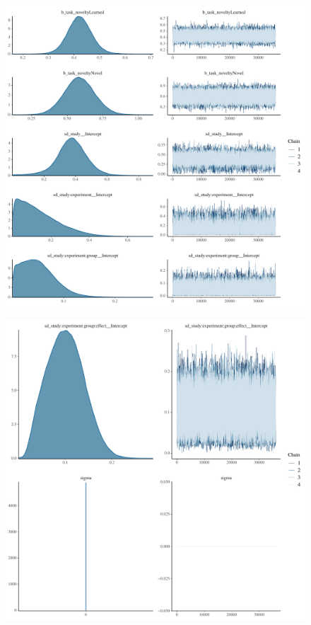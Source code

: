 \documentclass[
]{report}
\begin{document}
\begin{figure}

{\centering \includegraphics[width=1\textwidth,height=\textheight]{diagnostic_plots_files/figure-pdf/unnamed-chunk-17-1.pdf}

}

\end{figure}

\begin{figure}

{\centering \includegraphics[width=1\textwidth,height=\textheight]{diagnostic_plots_files/figure-pdf/unnamed-chunk-17-2.pdf}

}

\end{figure}
\end{document}
